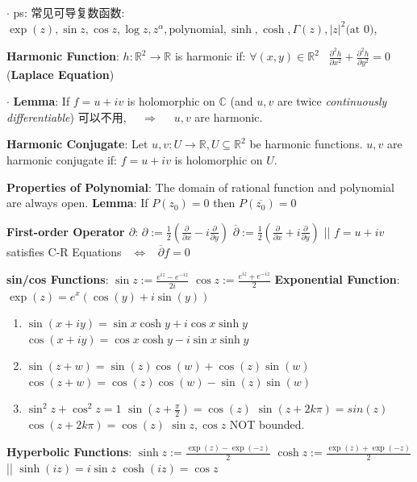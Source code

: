 \documentclass[9pt]{article}
\begin{document}
$\cdot$ {\footnotesize ps: 常见可导复数函数: $\exp(z),\sin z,\cos z,\log z,z^\alpha,\text{polynomial},\sinh,\cosh,\Gamma(z),|z|^2\text{(at 0)}$,} \quad {}

\textbf{Harmonic Function}: $h:\mathbb{R}^2\to\mathbb{R}$ is harmonic if: $\forall(x,y)\in\mathbb{R}^2$ \ $\frac{\partial^2h}{\partial x^2}+\frac{\partial^2h}{\partial y^2}=0$ {\footnotesize (\textbf{Laplace Equation})}

$\cdot$ \textbf{Lemma}: If $f=u+iv$ is holomorphic on $\mathbb{C}$ {\tiny (and $u,v$ are twice \textit{continuously differentiable}) 可以不用}, \ \ $\Rightarrow$ \ \ $u,v$ are harmonic.

\textbf{Harmonic Conjugate}: {\small Let $u,v:U\to\mathbb{R},U\subseteq\mathbb{R}^2 $ be harmonic functions. $u,v$ are harmonic conjugate if: $f=u+iv$ is holomorphic on $U$.}

\textbf{Properties of Polynomial}: {\small The domain of rational function and polynomial are always open.} \quad \quad \textbf{Lemma}: If $P(z_0)=0$ then $P(\overline{z_0})=0$

\textbf{First-order Operator $\partial$}: $\partial:=\frac{1}{2}\left(\frac{\partial}{\partial x}-i\frac{\partial}{\partial y}\right)$ \quad \quad $\overline{\partial}:=\frac{1}{2}\left(\frac{\partial}{\partial x}+i\frac{\partial}{\partial y}\right)$ \quad || \quad $f=u+iv$ satisfies C-R Equations \ $\Leftrightarrow$ \ $\overline{\partial}f=0$

\textbf{sin/cos Functions}: $\sin z:=\frac{e^{iz}-e^{-iz}}{2i}$ \quad \quad $\cos z:=\frac{e^{iz}+e^{-iz}}{2}$ \quad \quad \textbf{Exponential Function}: $\exp(z)=e^x(\cos(y)+i\sin(y))$

\begin{enumerate}[itemsep=-2pt, topsep=-2pt]
    \item $\sin(x+iy)=\sin x\cosh y+i\cos x\sinh y$ \quad $\cos(x+iy)=\cos x\cosh y-i\sin x\sinh y$
    \item $\sin(z+w)=\sin(z)\cos(w)+\cos(z)\sin(w)$ \quad $\cos(z+w)=\cos(z)\cos(w)-\sin(z)\sin(w)$ 
    \item $\sin^2z+\cos^2z=1$ \quad $\sin(z+\frac{\pi}{2})=\cos(z)$ \quad $\sin(z+2k\pi)=sin(z)$ \quad $\cos(z+2k\pi)=\cos(z)$ \quad \quad \star $\sin z,\cos z$ NOT bounded.
\end{enumerate}

\textbf{Hyperbolic Functions}: $\sinh z:=\frac{\exp(z)-\exp(-z)}{2}$ \quad \quad $\cosh z:=\frac{\exp(z)+\exp(-z)}{2}$ \quad \quad || \quad \quad $\sinh(iz)=i\sin z$ \quad $\cosh(iz)=\cos z$
\end{document}
